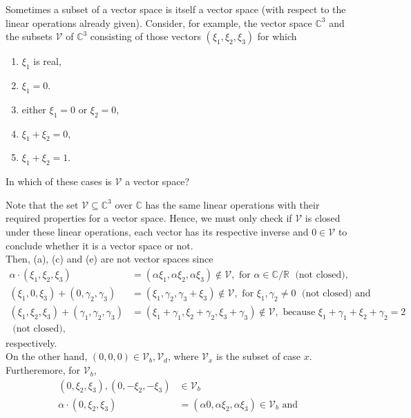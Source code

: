 \documentclass[12pt]{article}
\newcommand{\R}{\mathbb{R}}
\newenvironment{problem}[2][Problem]{\begin{trivlist} \item[\hskip \labelsep {\bfseries #1}\hskip \labelsep {\bfseries #2.}]}{\end{trivlist}}
\newenvironment{solution}[1][Solution]{\begin{trivlist} \item[\hskip \labelsep {\bfseries #1}]}{\end{trivlist}}
\begin{document}
\begin{problem}{4}
  Sometimes a subset of a vector space is itself a vector space (with respect to the linear operations already given). Consider, for example, the vector space $\mathbb{C}^{3}$ and the subsets $\mathcal{V}$ of $\mathbb{C}^{3}$ consisting of those vectors $(\xi_{1},\xi_{2},\xi_{3})$ for which 
\begin{enumerate}
  \item $\xi_{1}$ is real,
  \item $\xi_{1} = 0$.
  \item either $\xi_{1}=0$ or $\xi_{2}=0$,
  \item $\xi_{1}+\xi_{2} = 0$,
  \item $\xi_{1}+\xi_{2}=1$.
\end{enumerate}
In which of these cases is $\mathcal{V}$ a vector space?
\begin{solution}
  Note that the set $\mathcal{V}\subseteq \mathbb{C}^{3}$ over $\mathbb{C}$ has the same linear operations with their required properties for a vector space. Hence, we must only check if $\mathcal{V}$ is closed under these linear operations, each vector has its respective inverse and $0\in \mathcal{V}$ to conclude whether it is a vector space or not. \\
  Then, (a), (c) and (e) are not vector spaces since 
\begin{align*}
  \alpha\cdot (\xi_{1},\xi_{2},\xi_{3}) &= (\alpha\xi_{1},\alpha\xi_{2},\alpha\xi_{3}) \not\in \mathcal{V}, \text{ for }\alpha\in \mathbb{C}/\R\; \text{ (not closed)},\\
  (\xi_{1},0,\xi_{3}) + (0,\gamma_{2},\gamma_{3}) &= (\xi_{1},\gamma_{2},\gamma_{3}+\xi_{3}) \not\in \mathcal{V}, \text{ for }\xi_{1},\gamma_{2}\neq 0\; \text{ (not closed)} \text{ and}\\
  (\xi_{1},\xi_{2},\xi_{3}) + (\gamma_{1},\gamma_{2},\gamma_{3}) &= (\xi_{1} + \gamma_{1}, \xi_{2} + \gamma_{2}, \xi_{3} + \gamma_{3})\not\in \mathcal{V}, \text{ because }\xi_{1}+\gamma_{1}+\xi_{2}+\gamma_{2} = 2 \;\\
  \text{ (not closed)},
\end{align*}
respectively.\\
On the other hand, $(0,0,0)\in \mathcal{V}_{b},\mathcal{V}_{d}$, where $\mathcal{V}_{x}$ is the subset of case $x$. Furtheremore, for $\mathcal{V}_{b}$,  
\begin{align*}
  (0,\xi_{2},\xi_{3}), (0,-\xi_{2},-\xi_{3}) &\in\mathcal{V}_{b}\\ 
  \alpha\cdot (0,\xi_{2},\xi_{3}) &= (\alpha0,\alpha\xi_{2},\alpha\xi_{3})\in \mathcal{V}_{b} \text{ and }\\

\end{align*}
\end{solution}
\end{problem}
\end{document}
